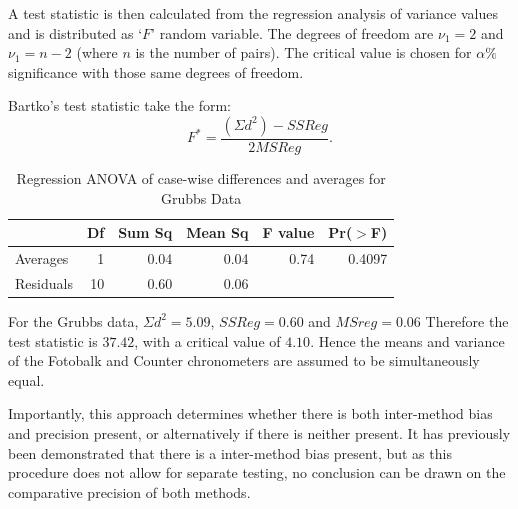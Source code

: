 \documentclass[12pt, a4paper]{report}
\theoremstyle{plain}
\theoremstyle{definition}
\theoremstyle{remark}
\begin{document}
A test statistic is then calculated from the regression analysis
of variance values \citep{BB89} and is distributed as `$F$' random
variable. The degrees of freedom are $\nu_{1}=2$ and $\nu_{1}=n-2$
(where $n$ is the number of pairs). The critical value is chosen
for $\alpha\%$ significance with those same degrees of freedom.



Bartko's test statistic take the form:
\[ F^{\ast} = \frac{(\Sigma d^{2})-SSReg}{2MSReg}.
\]
\begin{table}[ht]
	\begin{center}
		\begin{tabular}{lrrrrr}
			\hline
			& Df & Sum Sq & Mean Sq & F value & Pr($>$F) \\
			\hline
			Averages & 1 & 0.04 & 0.04 & 0.74 & 0.4097 \\
			Residuals & 10 & 0.60 & 0.06 &  &  \\
			\hline
		\end{tabular}
		\caption{Regression ANOVA of case-wise differences and averages
			for Grubbs Data}
	\end{center}
\end{table}
For the Grubbs data, $\Sigma d^{2}=5.09 $, $SSReg = 0.60$ and
$MSreg=0.06$ Therefore the test statistic is $37.42$, with a
critical value of $4.10$. Hence the means and variance of the
Fotobalk and Counter chronometers are assumed to be simultaneously
equal.

Importantly, this approach determines whether there is both
inter-method bias and precision present, or alternatively if there
is neither present. It has previously been demonstrated that there
is a inter-method bias present, but as this procedure does not
allow for separate testing, no conclusion can be drawn on the
comparative precision of both methods.



\end{document}

